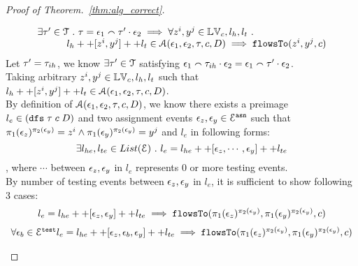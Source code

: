 \begin{proof}[Proof of Theorem.~\ref{thm:alg_correct}]
\begin{case}
\[\begin{array}{l}
    \exists \mathtt{\tau}' \in \mathcal{T} ~.~ \mathtt{\tau} = \mathtt{\epsilon}_1 \smallfrown \mathtt{\tau}' \cdot \mathtt{\epsilon}_2
   \implies \forall  z^i, y^j \in \mathbb{LV}_c, l_h, l_t ~.~
   \\ \quad \qquad 
   l_h ++ [z^i, y^j] ++ l_t \in \mathcal{A}(\mathtt{\epsilon}_1, \mathtt{\epsilon}_2, \mathtt{\tau}, c, D)
   \implies \mathtt{flowsTo}(z^i, y^j, c)  
\end{array}
\]
%
Let $\mathtt{\tau}' = \mathtt{\tau}_{ih}$, we know $\exists \mathtt{\tau}' \in \mathcal{T}$ satisfying 
$\mathtt{\epsilon}_1  {}\smallfrown \mathtt{\tau}_{ih} \cdot {} \mathtt{\epsilon}_2 = \mathtt{\epsilon}_1 \smallfrown \mathtt{\tau}' \cdot \mathtt{\epsilon}_2$.
\\
Taking arbitrary $z^i, y^j \in \mathbb{LV}_c, l_h, l_t$ such that 
$l_h ++ [z^i, y^j] ++ l_t \in \mathcal{A}(\mathtt{\epsilon}_1, \mathtt{\epsilon}_2, \mathtt{\tau}, c, D)$.
\\
By definition of $\mathcal{A}(\mathtt{\epsilon}_1, \mathtt{\epsilon}_2, \mathtt{\tau}, c, D)$, 
we know there exists a preimage $l_e \in (\mathtt{dfs} \; \mathtt{\tau} \; c \;  D )$ and two assignment events
$\mathtt{\epsilon}_z, \mathtt{\epsilon}_y \in \mathcal{E}^{\mathtt{{asn}}}$ such that $ \pi_1(\mathtt{\epsilon}_z)^{\pi_2(\mathtt{\epsilon}_y)} = z^i \land \pi_1(\mathtt{\epsilon}_y)^{\pi_2(\mathtt{\epsilon}_y)} = y^j$
and $l_e$ in following forms:
\\
\[
  \exists l_{he}, l_{te} \in List(\mathcal{E}) ~.~ 
  l_e = l_{he} ++ [\mathtt{\epsilon}_z, \cdots, \mathtt{\epsilon}_y] ++ l_{te}
\]
, where $ \cdots $ between $\mathtt{\epsilon}_z, \mathtt{\epsilon}_y$ in $l_e$ represents $0$ or more testing events.
\\
By number of testing events between $\mathtt{\epsilon}_z, \mathtt{\epsilon}_y$ in $l_e$, it is sufficient to show following 3 cases:
\begin{equation}
\begin{array}{l}
  l_e = l_{he} ++ [\mathtt{\epsilon}_z, \mathtt{\epsilon}_y] ++ l_{te}
   \implies \mathtt{flowsTo}(\pi_1(\mathtt{\epsilon}_z)^{\pi_2(\mathtt{\epsilon}_y)}, \pi_1(\mathtt{\epsilon}_y)^{\pi_2(\mathtt{\epsilon}_y)}, c)
\end{array}
\end{equation}
%
\begin{equation}
  \begin{array}{l}
    \forall \event_b \in \eventset^{\test}
    l_e = l_{he} ++ [\event_z, \event_b, \event_y] ++ l_{te}
     \implies \flowsto(\pi_1(\event_z)^{\pi_2(\event_y)}, \pi_1(\event_y)^{\pi_2(\event_y)}, c)
  \end{array}

\end{equation}
\end{case}
\end{proof}
